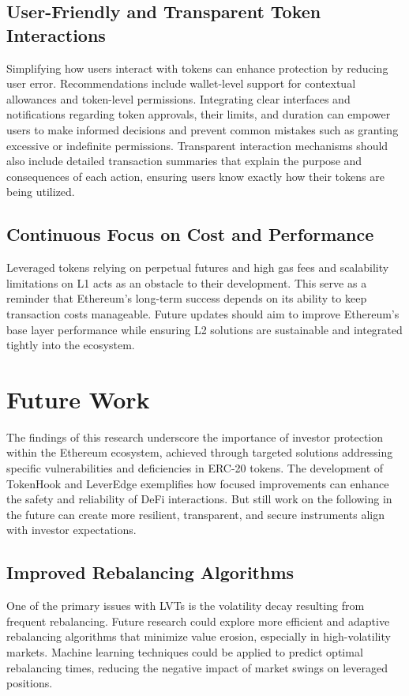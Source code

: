 \subsection{User-Friendly and Transparent Token Interactions}
Simplifying how users interact with tokens can enhance protection by reducing user error. Recommendations include wallet-level support for contextual allowances and token-level permissions. Integrating clear interfaces and notifications regarding token approvals, their limits, and duration can empower users to make informed decisions and prevent common mistakes such as granting excessive or indefinite permissions. Transparent interaction mechanisms should also include detailed transaction summaries that explain the purpose and consequences of each action, ensuring users know exactly how their tokens are being utilized. 

\subsection{Continuous Focus on Cost and Performance}
Leveraged tokens relying on perpetual futures and high gas fees and scalability limitations on L1 acts as an obstacle to their development. This serve as a reminder that Ethereum’s long-term success depends on its ability to keep transaction costs manageable. Future updates should aim to improve Ethereum's base layer performance while ensuring L2 solutions are sustainable and integrated tightly into the ecosystem.

\section{Future Work}
The findings of this research underscore the importance of investor protection within the Ethereum ecosystem, achieved through targeted solutions addressing specific vulnerabilities and deficiencies in ERC-20 tokens. The development of TokenHook and LeverEdge exemplifies how focused improvements can enhance the safety and reliability of DeFi interactions. But still work on the following in the future can create more resilient, transparent, and secure instruments align with investor expectations.

\subsection{Improved Rebalancing Algorithms}
One of the primary issues with LVTs is the volatility decay resulting from frequent rebalancing. Future research could explore more efficient and adaptive rebalancing algorithms that minimize value erosion, especially in high-volatility markets. Machine learning techniques could be applied to predict optimal rebalancing times, reducing the negative impact of market swings on leveraged positions.

